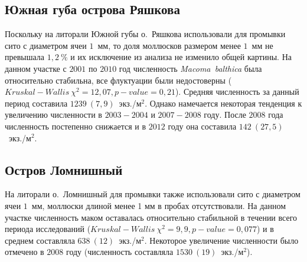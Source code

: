 \documentclass[12pt, a4paper]{disser}
\begin{document}
		\subsection{Южная губа острова Ряшкова}
Поскольку на литорали Южной губы о.~Ряшкова использовали для промывки сито с диаметром ячеи $1$~мм, то доля моллюсков размером менее $1$~мм не превышала $1,2~\%$ и их исключение из анализа не изменило общей картины.
На данном участке с $2001$ по $2010$ год численность {\it Macoma~balthica} была относительно стабильна, все флуктуации были недостоверны ($Kruskal-Wallis\ \chi^2 = 12,07, p-value = 0,21$). 
Средняя численность за данный период составила $1239~(7,9)$~экз./м$^2$.
Однако намечается некоторая тенденция к увеличению численности в $2003-2004$ и $2007-2008$ году.
После $2008$ года численность постепенно снижается и в $2012$ году она составила $142~(27,5)$~экз./м$^2$.

		\subsection{Остров Ломнишный}
На литорали о.~Ломнишный для промывки также использовали сито с диаметром ячеи $1$~мм, моллюски длиной менее 1 мм в пробах отсутствовали.
На данном участке численность маком оставалась относительно стабильной в течении всего периода исследований ($Kruskal-Wallis\ \chi^2 = 9,9, p-value = 0,077$) и в среднем составляла $638~(12)$~экз./м$^2$.
Некоторое увеличение численности было отмечено в $2008$ году (численность составляла $1530~(19)$~экз./м$^2$).
\end{document}
